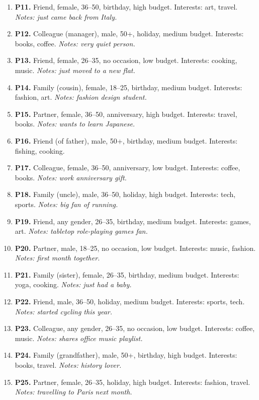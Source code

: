 \begin{enumerate}
    \item \textbf{P11.} Friend, female, 36--50, birthday, high budget. Interests: art, travel. \textit{Notes: just came back from Italy.}
    \item \textbf{P12.} Colleague (manager), male, 50+, holiday, medium budget. Interests: books, coffee. \textit{Notes: very quiet person.}
    \item \textbf{P13.} Friend, female, 26--35, no occasion, low budget. Interests: cooking, music. \textit{Notes: just moved to a new flat.}
    \item \textbf{P14.} Family (cousin), female, 18--25, birthday, medium budget. Interests: fashion, art. \textit{Notes: fashion design student.}
    \item \textbf{P15.} Partner, female, 36--50, anniversary, high budget. Interests: travel, books. \textit{Notes: wants to learn Japanese.}
    \item \textbf{P16.} Friend (of father), male, 50+, birthday, medium budget. Interests: fishing, cooking.
    \item \textbf{P17.} Colleague, female, 36--50, anniversary, low budget. Interests: coffee, books. \textit{Notes: work anniversary gift.}
    \item \textbf{P18.} Family (uncle), male, 36--50, holiday, high budget. Interests: tech, sports. \textit{Notes: big fan of running.}
    \item \textbf{P19.} Friend, any gender, 26--35, birthday, medium budget. Interests: games, art. \textit{Notes: tabletop role-playing games fan.}
    \item \textbf{P20.} Partner, male, 18--25, no occasion, low budget. Interests: music, fashion. \textit{Notes: first month together.}
    \item \textbf{P21.} Family (sister), female, 26--35, birthday, medium budget. Interests: yoga, cooking. \textit{Notes: just had a baby.}
    \item \textbf{P22.} Friend, male, 36--50, holiday, medium budget. Interests: sports, tech. \textit{Notes: started cycling this year.}
    \item \textbf{P23.} Colleague, any gender, 26--35, no occasion, low budget. Interests: coffee, music. \textit{Notes: shares office music playlist.}
    \item \textbf{P24.} Family (grandfather), male, 50+, birthday, high budget. Interests: books, travel. \textit{Notes: history lover.}
    \item \textbf{P25.} Partner, female, 26--35, holiday, high budget. Interests: fashion, travel. \textit{Notes: travelling to Paris next month.}

\end{enumerate}

